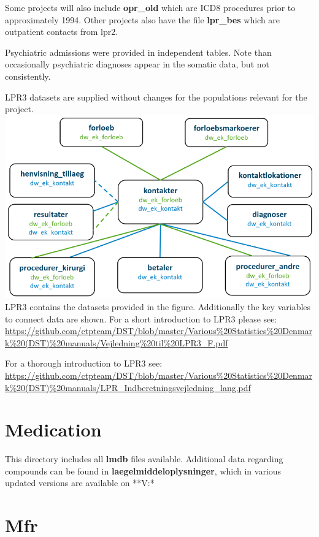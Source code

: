 \documentclass[
]{article}
\begin{document}
Some projects will also include \textbf{opr\_old} which are ICD8
procedures prior to approximately 1994. Other projects also have the
file \textbf{lpr\_bes} which are outpatient contacts from lpr2.

Psychiatric admissions were provided in independent tables. Note than
occasionally psychiatric diagnoses appear in the somatic data, but not
consistently.

LPR3 datasets are supplied without changes for the populations relevant
for the project. \includegraphics{./lpr3.png} LPR3 contains the datasets
provided in the figure. Additionally the key variables to connect data
are shown. For a short introduction to LPR3 please see:
\url{https://github.com/ctpteam/DST/blob/master/Various\%20Statistics\%20Denmark\%20(DST)\%20manuals/Vejledning\%20til\%20LPR3_F.pdf}

For a thorough introduction to LPR3 see:
\url{https://github.com/ctpteam/DST/blob/master/Various\%20Statistics\%20Denmark\%20(DST)\%20manuals/LPR_Indberetningsvejledning_lang.pdf}

\hypertarget{medication}{%
\section{Medication}\label{medication}}

This directory includes all \textbf{lmdb} files available. Additional
data regarding compounds can be found in
\textbf{laegelmiddeloplysninger}, which in various updated versions are
available on **V:\data\alle\LMDBdata**

\hypertarget{mfr}{%
\section{Mfr}\label{mfr}}
\end{document}
